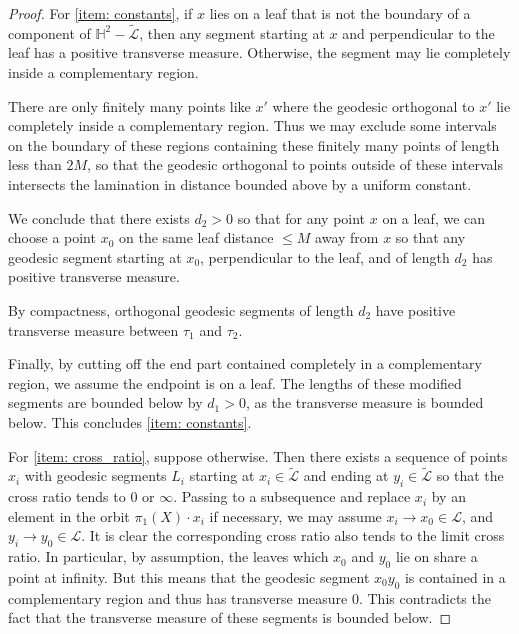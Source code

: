 \documentclass[11pt]{article} %
\theoremstyle{plain}
\theoremstyle{definition}
\numberwithin{equation}{section}
\begin{document}
\begin{proof}
For \ref{item: constants}, if $x$ lies on a leaf that is not the boundary of a component of $\mathbb{H}^2-\tilde{\mathcal{L}}$, then any segment starting at $x$ and perpendicular to the leaf has a positive transverse measure. Otherwise, the segment may lie completely inside a complementary region.

There are only finitely many points like $x'$ where the geodesic orthogonal to $x'$ lie completely inside a complementary region.
Thus we may exclude some intervals on the boundary of these regions containing these finitely many points of length less than $2M$, so that the geodesic orthogonal to points outside of these intervals 
intersects the lamination in distance bounded above by a uniform constant.

We conclude that there exists $d_2>0$ so that for any point $x$ on a leaf, we can choose a point $x_0$ on the same leaf distance $\le M$ away from $x$ so that any geodesic segment starting at $x_0$, perpendicular to the leaf, and of length $d_2$ has positive transverse measure.

By compactness, orthogonal geodesic segments of length $d_2$ have positive transverse measure between $\tau_1$ and $\tau_2$.

Finally, by cutting off the end part contained completely in a complementary region, we 
assume the endpoint is on a leaf. The lengths of these modified segments are bounded below by $d_1>0$, as the transverse measure is bounded below. This concludes \ref{item: constants}.

For \ref{item: cross_ratio}, suppose otherwise. Then there exists a sequence of points $x_i$ with geodesic segments $L_i$ starting at $x_i\in\tilde{\mathcal{L}}$ and ending at $y_i\in\tilde{\mathcal{L}}$ so that the cross ratio tends to $0$ or $\infty$. Passing to a subsequence and replace $x_i$ by an element in the orbit $\pi_1(X)\cdot x_i$ if necessary, we may assume $x_i\to x_0\in\mathcal{L}$, and $y_i\to y_0\in\mathcal{L}$. It is clear the corresponding cross ratio also tends to the limit cross ratio. In particular, by assumption, the leaves which $x_0$ and $y_0$ lie on share a point at infinity. But this means that the geodesic segment $x_0y_0$ is contained in a complementary region and thus has transverse measure $0$. This contradicts the fact that the transverse measure of these segments is bounded below.
\end{proof}
\end{document}
